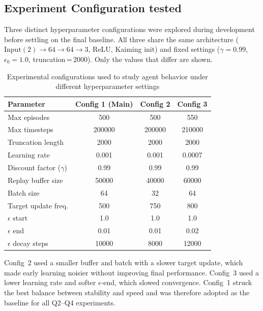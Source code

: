 \documentclass[11pt,a4paper]{article}
\begin{document}
\begin{appendices}
\section{Experiment Configuration tested}
Three distinct hyperparameter configurations were explored during development
before settling on the final baseline.  All three share the same architecture
(\(\text{Input}(2)\!\to\!64\!\to\!64\!\to\!3\), ReLU, Kaiming init) and
fixed settings (\(\gamma=0.99\), \(\epsilon_0=1.0\), truncation\,=\,2000).
Only the values that differ are shown.

\begin{table}[H]
\centering
\caption{Experimental configurations used to study agent behavior under different hyperparameter settings}
\label{tab:config_comparison}
\renewcommand{\arraystretch}{1.2}
\begin{tabular}{lccc}
\toprule
\textbf{Parameter} & \textbf{Config 1 (Main)} & \textbf{Config 2} & \textbf{Config 3} \\
\midrule
Max episodes         & 500      & 500      & 550 \\
Max timesteps        & 200000   & 200000   & 210000 \\
Truncation length    & 2000     & 2000     & 2000 \\
Learning rate        & 0.001    & 0.001    & 0.0007 \\
Discount factor ($\gamma$) & 0.99 & 0.99 & 0.99 \\
Replay buffer size   & 50000    & 40000    & 60000 \\
Batch size           & 64       & 32       & 64 \\
Target update freq.  & 500      & 750      & 800 \\
$\epsilon$ start     & 1.0      & 1.0      & 1.0 \\
$\epsilon$ end       & 0.01     & 0.01     & 0.02 \\
$\epsilon$ decay steps & 10000  & 8000     & 12000 \\
\bottomrule
\end{tabular}
\end{table}
Config~2 used a smaller buffer and batch with a slower target update, which
made early learning noisier without improving final performance.
Config~3 used a lower learning rate and softer \(\epsilon\)-end, which slowed
convergence.  Config~1 struck the best balance between stability and speed
and was therefore adopted as the baseline for all Q2--Q4 experiments.




\end{appendices}
\end{document}
